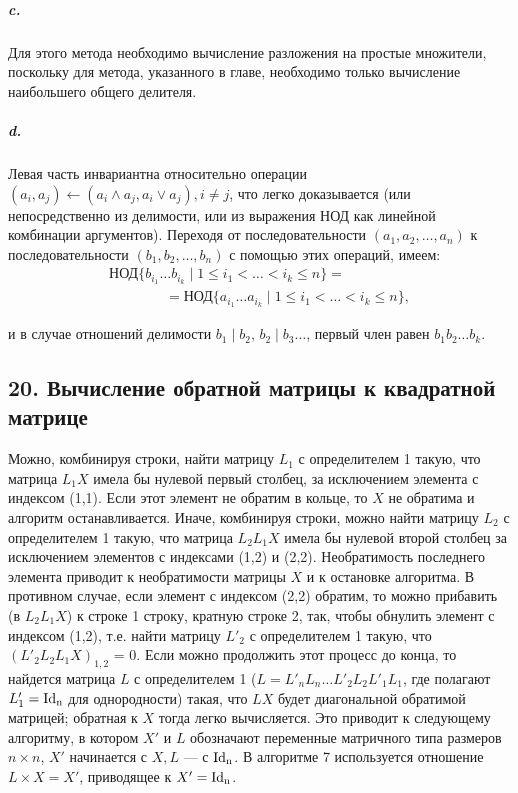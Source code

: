 {\subparagraph{c.} Для этого метода необходимо вычисление разложения на простые множители, поскольку для метода, указанного в главе, необходимо только вычисление наибольшего общего делителя.

\subparagraph{d.} Левая часть инвариантна относительно операции\linebreak
$(a_i,a_j) \longleftarrow (a_i \wedge a_{j},a_i \vee a_j), i \neq j$, что легко доказывается (или непосредственно из делимости, или из выражения НОД как линейной комбинации аргументов). Переходя от последовательности $(a_1,a_2,\ldots,a_n)$
к последовательности $(b_1,b_2,\ldots,b_n)$ с помощью этих операций, имеем:
\begin{eqnarray*}
& \text{НОД}\{b_{i_1}\ldots b_{i_k}\;|\;1 \leqslant i_1 < \dots < i_k \leqslant n\} =    & \\
& \qquad\qquad=\text{НОД}\{a_{i_1} \ldots a_{i_k}\;|\;1 \leqslant i_1 < \dots < i_k \leqslant n\}, &
\end{eqnarray*}

\noindent и в случае отношений делимости $b_1\;|\;b_2,\,b_2\;|\;b_3 \ldots$, первый член равен\linebreak
$b_{1}b_{2}\ldots b_k$.




\subsection{\normalsize{20. Вычисление обратной матрицы к квадратной матрице}}

Можно, комбинируя строки, найти матрицу $L_1$ с определителем 1
такую, что матрица $L_{1}X$ имела бы нулевой первый столбец, за исключением элемента с индексом (1,1). Если этот элемент не обратим
в кольце, то $X$ не обратима и алгоритм останавливается. Иначе, комбинируя строки, можно найти матрицу $L_2$ с определителем 1 такую,
что матрица $L_{2}L_{1}X$ имела бы нулевой второй столбец за исключением
элементов с индексами (1,2) и (2,2). Необратимость последнего элемента приводит к необратимости матрицы $X$ и к остановке алгоритма.
В противном случае, если элемент с индексом (2,2) обратим, то можно прибавить (в $L_{2}L_{1}X$) к строке 1 строку, кратную строке 2, так,
чтобы обнулить элемент с индексом (1,2), т.е. найти матрицу $L'_{2}$ с
определителем 1 такую, что $(L'_{2}L_{2}L_{1}X)_{1,2}$ = 0. Если можно продолжить этот процесс до конца, то найдется матрица $L$ с определителем 1
($L = L'_{n}L_{n}\ldots L'_{2}L_{2}L'_{1}L_{1}$, где полагают $L'_{1} = \rm{I}{d_n}$ для однородности) такая, что $LX$ будет диагональной обратимой матрицей; обратная к $X$
тогда легко вычисляется. Это приводит к следующему алгоритму, в котором $X'$ и $L$ обозначают переменные матричного типа размеров $n \times n$,
$X'$ начинается с $X, L$ --- с $\rm{I}{d_n}$. В алгоритме 7 используется отношение
$L \times X = X'$, приводящее к $X' = \rm{I}{d_n}$.

}
